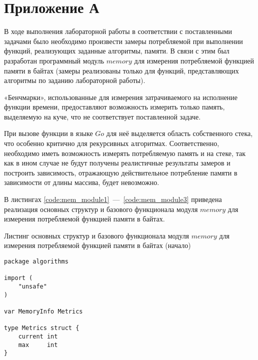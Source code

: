 \setcounter{chapter}{5}
\setcounter{listing}{0}
\chapter*{Приложение А}
\label{appendix}

В ходе выполнения лабораторной работы в соответствии с поставленными задачами было необходимо произвести замеры потребляемой при выполнении функций, реализующих заданные алгоритмы, памяти. В связи с этим был разработан программный модуль $memory$ для измерения потребляемой функцией памяти в байтах (замеры реализованы только для функций, представляющих алгоритмы по заданию лабораторной работы). 

«Бенчмарки», использованные для измерения затрачиваемого на исполнение функции времени, предоставляют возможность измерить только память, выделяемую на куче, что не соответствует поставленной задаче. 

При вызове функции в языке $Go$ для неё выделяется область собственного стека, что особенно критично для рекурсивных алгоритмах. Соответственно, необходимо иметь возможность измерять потребляемую память и на стеке, так как в ином случае не будут получены реалистичные результаты замеров и построить зависимость, отражающую действительное потребление памяти в зависимости от длины массива, будет невозможно.

В листингах \ref{code:mem_module1}~---~\ref{code:mem_module3} приведена реализация основных структур и базового функционала модуля $memory$ для измерения потребляемой функцией памяти в байтах.

\begin{code}
\caption{Листинг основных структур и базового функционала модуля $memory$ для измерения потребляемой функцией памяти в байтах (начало)}
\label{code:mem_module1}

\begin{verbatim}
package algorithms

import (
	"unsafe"
)

var MemoryInfo Metrics

type Metrics struct {
	current int
	max     int
}
\end{verbatim}
\end{code}

\newpage

